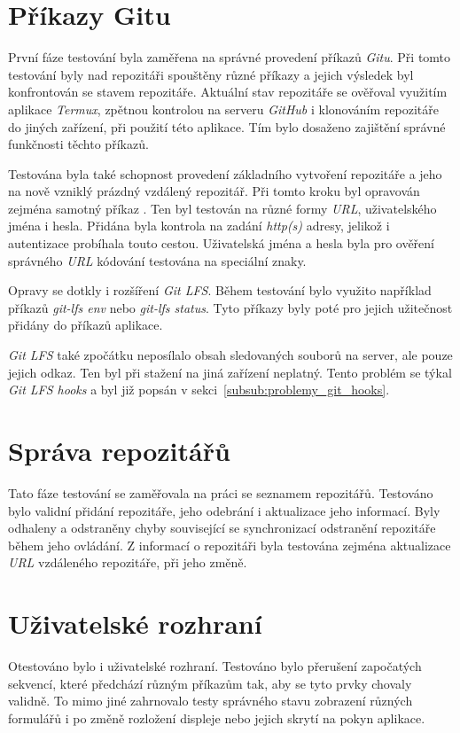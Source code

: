 \section{Příkazy Gitu}
První fáze testování byla zaměřena na správné provedení příkazů \emph{Gitu}. Při tomto testování byly nad repozitáři spouštěny různé příkazy a jejich výsledek byl konfrontován se stavem repozitáře. Aktuální stav repozitáře se ověřoval využitím aplikace \emph{Termux}, zpětnou kontrolou na serveru \emph{GitHub} i klonováním repozitáře do jiných zařízení, při použití této aplikace. Tím bylo dosaženo zajištění správné funkčnosti těchto příkazů.

Testována byla také schopnost provedení základního vytvoření repozitáře a jeho  na nově vzniklý prázdný vzdálený repozitář. Při tomto kroku byl opravován zejména samotný příkaz . Ten byl testován na různé formy \emph{URL}, uživatelského jména i hesla. Přidána byla kontrola na zadání \emph{http(s)} adresy, jelikož i autentizace probíhala touto cestou. Uživatelská jména a hesla byla pro ověření správného \emph{URL} kódování testována na speciální znaky.

Opravy se dotkly i rozšíření \emph{Git LFS}. Během testování bylo využito například příkazů \emph{git-lfs env} nebo \emph{git-lfs status}. Tyto příkazy byly poté pro jejich užitečnost přidány do příkazů aplikace.

\emph{Git LFS} také zpočátku neposílalo obsah sledovaných souborů na server, ale pouze jejich odkaz. Ten byl při stažení na jiná zařízení neplatný. Tento problém se týkal \emph{Git LFS hooks} a byl již popsán v sekci~\ref{subsub:problemy_git_hooks}.

\section{Správa repozitářů}
Tato fáze testování se zaměřovala na práci se seznamem repozitářů. Testováno bylo validní přidání repozitáře, jeho odebrání i aktualizace jeho informací. Byly odhaleny a odstraněny chyby související se synchronizací odstranění repozitáře během jeho ovládání. Z informací o repozitáři byla testována zejména aktualizace \emph{URL} vzdáleného repozitáře, při jeho změně.

\newpage
\section{Uživatelské rozhraní}
Otestováno bylo i uživatelské rozhraní. Testováno bylo přerušení započatých sekvencí, které předchází různým příkazům tak, aby se tyto prvky chovaly validně. To mimo jiné zahrnovalo testy správného stavu zobrazení různých formulářů i po změně rozložení displeje nebo jejich skrytí na pokyn aplikace.

